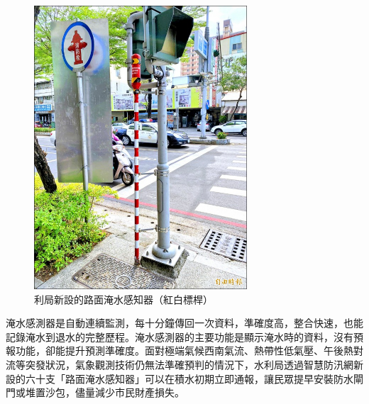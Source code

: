 \documentclass[a4paper,12pt]{article}
\begin{document}
\begin{enumerate}
\begin{figure}[htbp]
\centering
\includegraphics[width=300]{images/ks218.jpg}
\caption{\label{fig:FigName}利局新設的路面淹水感知器（紅白標桿）}
\end{figure}

淹水感測器是自動連續監測，每十分鐘傳回一次資料，準確度高，整合快速，也能記錄淹水到退水的完整歷程。淹水感測器的主要功能是顯示淹水時的資料，沒有預報功能，卻能提升預測準確度。面對極端氣候西南氣流、熱帶性低氣壓、午後熱對流等突發狀況，氣象觀測技術仍無法準確預判的情況下，水利局透過智慧防汛網新設的六十支「路面淹水感知器」可以在積水初期立即通報，讓民眾提早安裝防水閘門或堆置沙包，儘量減少市民財產損失。\\


\end{enumerate}
\end{document}

